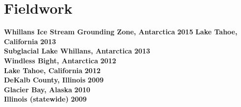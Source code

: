 \section{Fieldwork} 

\textbf{Whillans Ice Stream Grounding Zone, Antarctica} \hfill \textbf{2015}
\textbf{Lake Tahoe, California} \hfill \textbf{2013}\\
\textbf{Subglacial Lake Whillans, Antarctica} \hfill \textbf{2013}\\
\textbf{Windless Bight, Antarctica} \hfill \textbf{2012}\\
\textbf{Lake Tahoe, California} \hfill \textbf{2012}\\
\textbf{DeKalb County, Illinois} \hfill \textbf{2009}\\
\textbf{Glacier Bay, Alaska} \hfill \textbf{2010}\\
\textbf{Illinois (statewide)} \hfill \textbf{2009}\\
